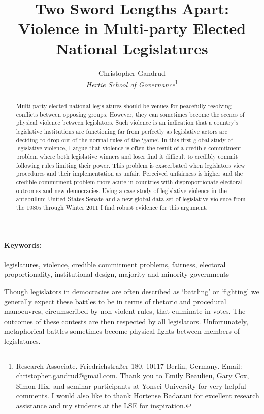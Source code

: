 \documentclass[a4paper]{article}\usepackage[]{graphicx}\usepackage[]{color}
\title{Two Sword Lengths Apart: Violence in Multi-party Elected National Legislatures}
\author{Christopher Gandrud \\
                {\emph{Hertie School of Governance}}\footnote{Research Associate. Friedrichstra{\ss}er 180. 10117 Berlin, Germany. Email: \href{mailto:christopher.gandrud@gmail.com}{christopher.gandrud@gmail.com}. Thank you to Emily Beaulieu, Gary Cox, Simon Hix, and seminar participants at Yonsei University for very helpful comments. I would also like to thank Hortense Badarani for excellent research assistance and my students at the LSE for inspiration.}}
\date{}
\begin{document}
\maketitle

\begin{abstract}
Multi-party elected national legislatures should be venues for peacefully resolving conflicts between opposing groups. However, they can sometimes become the scenes of physical violence between legislators. Such violence is an indication that a country's legislative institutions are functioning far from perfectly as legislative actors are deciding to drop out of the normal rules of the `game'. In this first global study of legislative violence, I argue that violence is often the result of a credible commitment problem where both legislative winners and loser find it difficult to credibly commit following rules limiting their power. This problem is exacerbated when legislators view procedures and their implementation as unfair. Perceived unfairness is higher and the credible commitment problem more acute in countries with disproportionate electoral outcomes and new democracies. Using a case study of legislative violence in the antebullum United States Senate and a new global data set of legislative violence from the 1980s through Winter 2011 I find robust evidence for this argument.
\end{abstract}


\paragraph{Keywords:} legislatures, violence, credible commitment problems, fairness, electoral proportionality, institutional design, majority and minority governments

\vspace{0.3cm}


Though legislators in democracies are often described as `battling' or `fighting' we generally expect these battles to be in terms of rhetoric and procedural manoeuvres, circumscribed by non-violent rules, that culminate in votes. The outcomes of these contests are then respected by all legislators. Unfortunately, metaphorical battles sometimes become physical fights between members of legislatures. 
\end{document}
